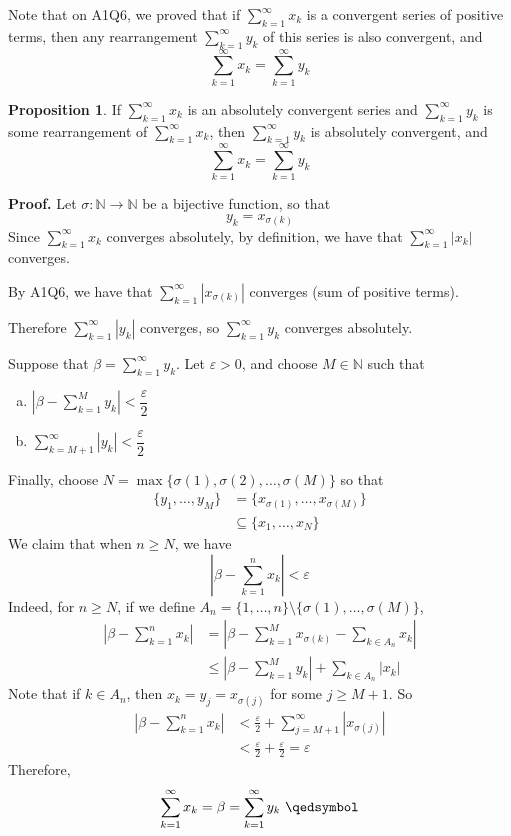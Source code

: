 \documentclass[11pt]{article}
\theoremstyle{definition}
\newtheorem{prop}[thm]{Proposition}
\newcommand{\mbN}{\ensuremath{\mathbb{N}}}
\begin{document}
Note that on A1Q6, we proved that if $\sum_{k=1}^\infty x_k$ is a convergent series of positive terms, then any rearrangement $\sum_{k=1}^\infty y_k$ of this series is also convergent, and
$$\sum_{k=1}^\infty x_k = \sum_{k=1}^\infty y_k$$

\begin{prop}
If $\sum_{k=1}^\infty x_k$ is an absolutely convergent series and $\sum_{k=1}^\infty y_k$ is some rearrangement of $\sum_{k=1}^\infty x_k$, then $\sum_{k=1}^\infty y_k$ is absolutely convergent, and
$$\sum_{k=1}^\infty x_k = \sum_{k=1}^\infty y_k$$
\end{prop}
\textbf{Proof.} Let $\sigma : \mbN \to \mbN$ be a bijective function, so that
$$y_k = x_{\sigma(k)}$$
Since $\sum_{k=1}^\infty x_k$ converges absolutely, by definition, we have that $\sum_{k=1}^\infty |x_k|$ converges. 

By A1Q6, we have that $\sum_{k=1}^\infty |x_{\sigma(k)}|$ converges (sum of positive terms).

Therefore $\sum_{k=1}^\infty |y_k|$ converges, so $\sum_{k=1}^\infty y_k$ converges absolutely. 

Suppose that $\beta = \sum_{k=1}^\infty y_k$. Let $\varepsilon > 0$, and choose $M \in \mbN$ such that
\begin{enumerate}[(a)]
\item $\left| \beta - \displaystyle\sum_{k=1}^M y_k \right| < \dfrac{\varepsilon}2$
\item $\displaystyle\sum_{k=M+1}^\infty |y_k| < \dfrac{\varepsilon}2$
\end{enumerate}
Finally, choose $N = \max\{\sigma(1), \sigma(2), \dots, \sigma(M)\}$ so that
\begin{align*}
\{y_1, \dots, y_M\} & = \{x_{\sigma(1)}, \dots, x_{\sigma(M)}\} \\ & \subseteq \{x_1, \dots, x_N\}
\end{align*}
We claim that when $n \geq N$, we have
$$\left| \beta - \sum_{k=1}^n x_k \right| < \varepsilon$$
Indeed, for $n \geq N$, if we define $A_n = \{1, \dots, n\} \setminus \{\sigma(1), \dots, \sigma(M)\}$,
\begin{align*}
\left| \beta - \sum_{k=1}^n x_k \right| & = \left| \beta - \sum_{k=1}^M x_{\sigma(k)} - \sum_{k \in A_n} x_k \right| \\
& \leq \left| \beta - \sum_{k=1}^M y_k \right| + \sum_{k \in A_n} |x_k|
\end{align*}
Note that if $k \in A_n$, then $x_k = y_j = x_{\sigma(j)}$ for some $j \geq M+1$. So
\begin{align*}
\left| \beta - \sum_{k=1}^n x_k \right| & < \frac{\varepsilon}2 + \sum_{j=M+1}^\infty |x_{\sigma(j)}| \\
& < \frac{\varepsilon}2 + \frac{\varepsilon}2 = \varepsilon
\end{align*}
Therefore,
$$\sum_{k=1}^\infty x_k = \beta = \sum_{k=1}^\infty y_k \text{ } \qedsymbol$$
\end{document}
